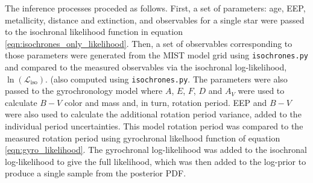 The inference processes proceded as follows.
First, a set of parameters: age, EEP, metallicity, distance and extinction,
and observables for a single star were passed to the isochronal likelihood
function in equation \eqref{eqn:isochrones_only_likelihood}.
Then, a set of observables corresponding to those parameters were generated
from the MIST model grid using {\tt isochrones.py} and compared to the
measured observables via the isochronal log-likelihood,
$\ln(\mathcal{L}_{\mathrm{iso}})$.  (also computed using
{\tt isochrones.py}.
The parameters were also passed to the gyrochronology model where $A$, $E$,
$F$, $D$ and $A_V$ were used to calculate $B-V$ color and mass and, in turn,
rotation period.
EEP and $B-V$ were also used to calculate the additional rotation period
variance, added to the individual period uncertainties.
This model rotation period was compared to the measured rotation period using
gyrochronal likelhood function of equation \ref{eqn:gyro_likelihood}.
The gyrochronal log-likelihood was added to the isochronal log-likelihood to
give the full likelihood, which was then added to the log-prior to produce a
single sample from the posterior PDF.

